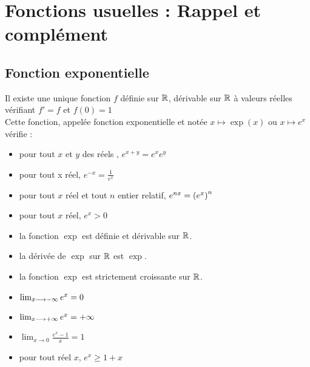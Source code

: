\chapter{Fonctions usuelles : Rappel et complément}

\minitoc
\section{Fonction exponentielle}
\begin{defprop}
	Il existe une unique fonction \(f\) définie sur \(\mathbb{R}\), dérivable sur \(\mathbb{R}\) à valeurs réelles vérifiant \(f' = f\) et \(f(0) = 1\) \\
	Cette fonction, appelée fonction exponentielle et notée \(x\mapsto \exp(x)\) ou \(x\mapsto e^x\) vérifie :
	\begin{itemize}
		\item pour tout \(x\) et \(y\) des réels , \(e^{x+y}  =e^xe^y\)
		\item pour tout x réel, \(e^{-x} = \frac{1}{e^x} \)
		\item pour tout \(x\) réel et tout \(n\) entier relatif, \(e^{nx} = \left(e^x\right)^n\)
		\item pour tout \(x\) réel, \(e^x >0\)
		\item la fonction \(\exp\) est définie et dérivable sur \(\mathbb{R}\).
		\item la dérivée de \(\exp\) sur \(\mathbb{R}\) est \(\exp\).
		\item la fonction \(\exp\) est strictement croissante sur \(\mathbb{R}\).
		\item \(\lim_{x\longrightarrow-\infty}e^x =0\)
		\item \(\lim_{x\longrightarrow+\infty} e^x = +\infty \)
		\item \(\lim_{x\to 0} \frac{e^x-1}{x} = 1\)
		\item pour tout réel \(x\), \(e^x\geq 1+x\)
	\end{itemize}
\end{defprop}

